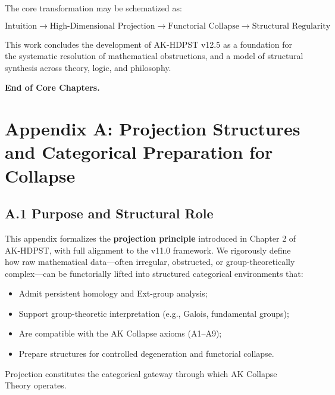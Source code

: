 \documentclass[11pt]{article}
\begin{document}
The core transformation may be schematized as:

\[
\boxed{
\text{Intuition} \longrightarrow 
\text{High-Dimensional Projection} \longrightarrow 
\text{Functorial Collapse} \longrightarrow 
\text{Structural Regularity}
}
\]

This work concludes the development of AK-HDPST v12.5 as a foundation for the systematic resolution of mathematical obstructions, and a model of structural synthesis across theory, logic, and philosophy.

\vspace{1em}
\noindent\textbf{End of Core Chapters.}



\appendix
\section*{Appendix A: Projection Structures and Categorical Preparation for Collapse}

\subsection*{A.1 Purpose and Structural Role}

This appendix formalizes the \textbf{projection principle} introduced in Chapter 2 of AK-HDPST, with full alignment to the v11.0 framework. We rigorously define how raw mathematical data—often irregular, obstructed, or group-theoretically complex—can be functorially lifted into structured categorical environments that:

\begin{itemize}
    \item Admit persistent homology and Ext-group analysis;
    \item Support group-theoretic interpretation (e.g., Galois, fundamental groups);
    \item Are compatible with the AK Collapse axioms (A1–A9);
    \item Prepare structures for controlled degeneration and functorial collapse.
\end{itemize}

Projection constitutes the categorical gateway through which AK Collapse Theory operates.
\end{document}
